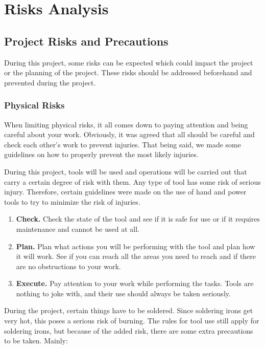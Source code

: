 \chapter{Risks Analysis } 

\section{Project Risks and Precautions}

During this project, some risks can be expected which could impact the project or the planning of the project. These risks should be addressed beforehand and prevented during the project.

\subsection{Physical Risks}
When limiting physical risks, it all comes down to paying attention and being careful about your work. Obviously, it was agreed that all should be careful and check each other's work to prevent injuries. That being said, we made some guidelines on how to properly prevent the most likely injuries.

During this project, tools will be used and operations will be carried out that carry a certain degree of risk with them. Any type of tool has some risk of serious injury. Therefore, certain guidelines were made on the use of hand and power tools to try to minimize the risk of injuries.

\begin{enumerate}
    \item \textbf{Check.} Check the state of the tool and see if it is safe for use or if it requires maintenance and cannot be used at all.
    \item \textbf{Plan.} Plan what actions you will be performing with the tool and plan how it will work. See if you can reach all the areas you need to reach and if there are no obstructions to your work.
    \item \textbf{Execute.} Pay attention to your work while performing the tasks. Tools are nothing to joke with, and their use should always be taken seriously.
\end{enumerate}

During the project, certain things have to be soldered. Since soldering irons get very hot, this poses a serious risk of burning. The rules for tool use still apply for soldering irons, but because of the added risk, there are some extra precautions to be taken. Mainly:

